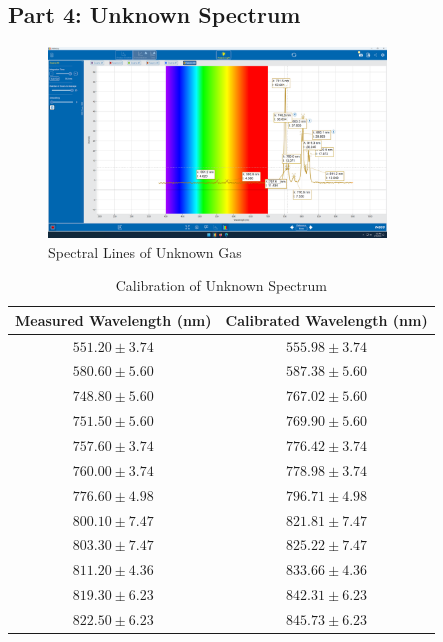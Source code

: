 \subsection{Part 4: Unknown Spectrum}
\begin{figure}[H]    \centering
    \includegraphics[width=0.8\textwidth]{Results/photospectrometry/unknown.png}
    \caption{Spectral Lines of Unknown Gas}
    \label{fig:unknown_spectrum}
\end{figure}

\begin{table}
    \centering
    \begin{tabular}{|c|c|}
        \hline
        Measured Wavelength (nm) & Calibrated Wavelength (nm) \\
        \hline
        $551.20 \pm 3.74$ & $555.98 \pm 3.74$ \\
        $580.60 \pm 5.60$ & $587.38 \pm 5.60$ \\
        $748.80 \pm 5.60$ & $767.02 \pm 5.60$ \\
        $751.50 \pm 5.60$ & $769.90 \pm 5.60$ \\
        $757.60 \pm 3.74$ & $776.42 \pm 3.74$ \\
        $760.00 \pm 3.74$ & $778.98 \pm 3.74$ \\
        $776.60 \pm 4.98$ & $796.71 \pm 4.98$ \\
        $800.10 \pm 7.47$ & $821.81 \pm 7.47$ \\
        $803.30 \pm 7.47$ & $825.22 \pm 7.47$ \\
        $811.20 \pm 4.36$ & $833.66 \pm 4.36$ \\
        $819.30 \pm 6.23$ & $842.31 \pm 6.23$ \\
        $822.50 \pm 6.23$ & $845.73 \pm 6.23$ \\
        \hline
    \end{tabular}
    \caption{Calibration of Unknown Spectrum}
\end{table}

